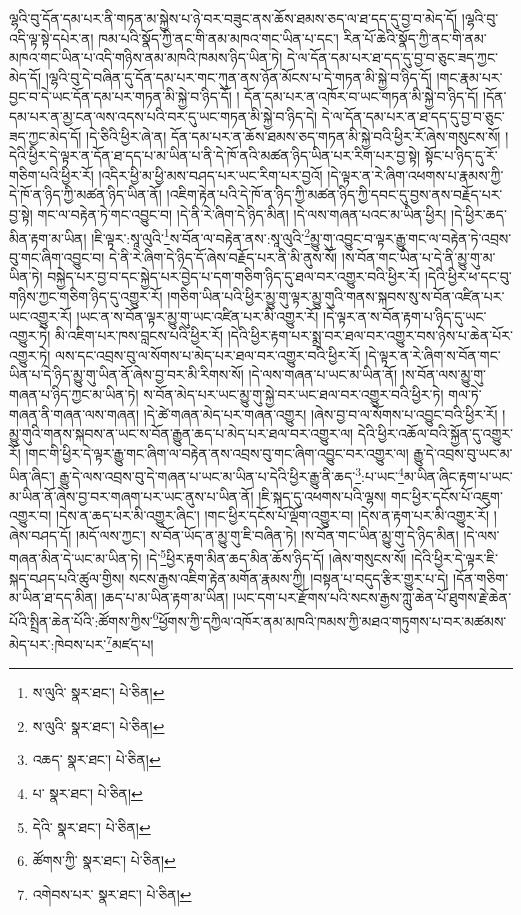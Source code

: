 ལྷའི་བུ་དོན་དམ་པར་ནི་གཏན་མ་སྐྱེས་པ་ཉེ་བར་བཟུང་ནས་ཆོས་ཐམས་ཅད་ལ་ཐ་དད་དུ་བྱ་བ་མེད་དོ། །ལྷའི་བུ་འདི་ལྟ་སྟེ་དཔེར་ན། ཁམ་པའི་སྣོད་ཀྱི་ནང་གི་ནམ་མཁའ་གང་ཡིན་པ་དང་། རིན་པོ་ཆེའི་སྣོད་ཀྱི་ནང་གི་ནམ་མཁའ་གང་ཡིན་པ་འདི་གཉིས་ནམ་མཁའི་ཁམས་ཉིད་ཡིན་ཏེ། དེ་ལ་དོན་དམ་པར་ཐ་དད་དུ་བྱ་བ་ཅུང་ཟད་ཀྱང་མེད་དོ། །ལྷའི་བུ་དེ་བཞིན་དུ་དོན་དམ་པར་གང་ཀུན་ནས་ཉོན་མོངས་པ་དེ་གཏན་མི་སྐྱེ་བ་ཉིད་དོ། །གང་རྣམ་པར་བྱང་བ་དེ་ཡང་དོན་དམ་པར་གཏན་མི་སྐྱེ་བ་ཉིད་དོ། །
དོན་དམ་པར་ན་འཁོར་བ་ཡང་གཏན་མི་སྐྱེ་བ་ཉིད་དོ། །དོན་དམ་པར་ན་མྱ་ངན་ལས་འདས་པའི་བར་དུ་ཡང་གཏན་མི་སྐྱེ་བ་ཉིད་དེ། དེ་ལ་དོན་དམ་པར་ན་ཐ་དད་དུ་བྱ་བ་ཅུང་ཟད་ཀྱང་མེད་དོ། །དེ་ཅིའི་ཕྱིར་ཞེ་ན། དོན་དམ་པར་ན་ཆོས་ཐམས་ཅད་གཏན་མི་སྐྱེ་བའི་ཕྱིར་རོ་ཞེས་གསུངས་སོ། །དེའི་ཕྱིར་དེ་ལྟར་ན་དོན་ཐ་དད་པ་མ་ཡིན་པ་ནི་དེ་ཁོ་ནའི་མཚན་ཉིད་ཡིན་པར་རིག་པར་བྱ་སྟེ། སྟོང་པ་ཉིད་དུ་རོ་གཅིག་པའི་ཕྱིར་རོ། །འདིར་ཕྱི་མ་ཕྱི་མས་བཤད་པར་ཡང་རིག་པར་བྱའོ། །དེ་ལྟར་ན་རེ་ཞིག་འཕགས་པ་རྣམས་ཀྱི་དེ་ཁོ་ན་ཉིད་ཀྱི་མཚན་ཉིད་ཡིན་ནོ། །འཇིག་རྟེན་པའི་དེ་ཁོ་ན་ཉིད་ཀྱི་མཚན་ཉིད་ཀྱི་དབང་དུ་བྱས་ནས་བརྗོད་པར་བྱ་སྟེ། གང་ལ་བརྟེན་ཏེ་གང་འབྱུང་བ། །དེ་ནི་རེ་ཞིག་དེ་ཉིད་མིན། །དེ་ལས་གཞན་པའང་མ་ཡིན་ཕྱིར། །དེ་ཕྱིར་ཆད་མིན་རྟག་མ་ཡིན། །ཇི་ལྟར་:སཱ་ལུའི་\footnote{ས་ལུའི་  སྣར་ཐང་།  པེ་ཅིན། }ས་བོན་ལ་བརྟེན་ནས་:སཱ་ལུའི་\footnote{ས་ལུའི་  སྣར་ཐང་།  པེ་ཅིན། }མྱུ་གུ་འབྱུང་བ་ལྟར་རྒྱུ་གང་ལ་བརྟེན་ཏེ་འབྲས་བུ་གང་ཞིག་འབྱུང་བ། དེ་ནི་རེ་ཞིག་དེ་ཉིད་དོ་ཞེས་བརྗོད་པར་ནི་མི་ནུས་སོ། །ས་བོན་གང་ཡིན་པ་དེ་ནི་མྱུ་གུ་མ་ཡིན་ཏེ། བསྐྱེད་པར་བྱ་བ་དང་སྐྱེད་པར་བྱེད་པ་དག་གཅིག་ཉིད་དུ་ཐལ་བར་འགྱུར་བའི་ཕྱིར་རོ། །དེའི་ཕྱིར་ཕ་དང་བུ་གཉིས་ཀྱང་གཅིག་ཉིད་དུ་འགྱུར་རོ། །གཅིག་ཡིན་པའི་ཕྱིར་མྱུ་གུ་ལྟར་མྱུ་གུའི་གནས་སྐབས་སུ་ས་བོན་འཛིན་པར་ཡང་འགྱུར་རོ། །ཡང་ན་ས་བོན་ལྟར་མྱུ་གུ་ཡང་འཛིན་པར་མི་འགྱུར་རོ། །དེ་ལྟར་ན་ས་བོན་རྟག་པ་ཉིད་དུ་ཡང་འགྱུར་ཏེ། མི་འཇིག་པར་ཁས་བླངས་པའི་ཕྱིར་རོ། །དེའི་ཕྱིར་རྟག་པར་སྨྲ་བར་ཐལ་བར་འགྱུར་བས་ཉེས་པ་ཆེན་པོར་འགྱུར་ཏེ། ལས་དང་འབྲས་བུ་ལ་སོགས་པ་མེད་པར་ཐལ་བར་འགྱུར་བའི་ཕྱིར་རོ། །དེ་ལྟར་ན་རེ་ཞིག་ས་བོན་གང་ཡིན་པ་དེ་ཉིད་མྱུ་གུ་ཡིན་ནོ་ཞེས་བྱ་བར་མི་རིགས་སོ། །དེ་ལས་གཞན་པ་ཡང་མ་ཡིན་ནོ། །ས་བོན་ལས་མྱུ་གུ་གཞན་པ་ཉིད་ཀྱང་མ་ཡིན་ཏེ། ས་བོན་མེད་པར་ཡང་མྱུ་གུ་སྐྱེ་བར་ཡང་ཐལ་བར་འགྱུར་བའི་ཕྱིར་ཏེ། གལ་ཏེ་གཞན་ནི་གཞན་ལས་གཞན། །དེ་ཚེ་གཞན་མེད་པར་གཞན་འགྱུར། །ཞེས་བྱ་བ་ལ་སོགས་པ་འབྱུང་བའི་ཕྱིར་རོ། །མྱུ་གུའི་གནས་སྐབས་ན་ཡང་ས་བོན་རྒྱུན་ཆད་པ་མེད་པར་ཐལ་བར་འགྱུར་ལ། དེའི་ཕྱིར་འཆོལ་བའི་སྐྱོན་དུ་འགྱུར་རོ། །གང་གི་ཕྱིར་དེ་ལྟར་རྒྱུ་གང་ཞིག་ལ་བརྟེན་ནས་འབྲས་བུ་གང་ཞིག་འབྱུང་བར་འགྱུར་ལ། རྒྱུ་དེ་འབྲས་བུ་ཡང་མ་ཡིན་ཞིང་། རྒྱུ་དེ་ལས་འབྲས་བུ་དེ་གཞན་པ་ཡང་མ་ཡིན་པ་དེའི་ཕྱིར་རྒྱུ་ནི་ཆད་\footnote{འཆད་  སྣར་ཐང་།  པེ་ཅིན། }:པ་ཡང་\footnote{པ་  སྣར་ཐང་།  པེ་ཅིན། }མ་ཡིན་ཞིང་རྟག་པ་ཡང་མ་ཡིན་ནོ་ཞེས་བྱ་བར་གཞག་པར་ཡང་ནུས་པ་ཡིན་ནོ། །ཇི་སྐད་དུ་འཕགས་པའི་ལྷས། གང་ཕྱིར་དངོས་པོ་འཇུག་འགྱུར་བ། །དེས་ན་ཆད་པར་མི་འགྱུར་ཞིང་། །གང་ཕྱིར་དངོས་པོ་ལྡོག་འགྱུར་བ། །དེས་ན་རྟག་པར་མི་འགྱུར་རོ། །ཞེས་བཤད་དོ། །མདོ་ལས་ཀྱང་། ས་བོན་ཡོད་ན་མྱུ་གུ་ཇི་བཞིན་ཏེ། །ས་བོན་གང་ཡིན་མྱུ་གུ་དེ་ཉིད་མིན། །དེ་ལས་གཞན་མིན་དེ་ཡང་མ་ཡིན་ཏེ། །དེ་\footnote{དེའི་  སྣར་ཐང་།  པེ་ཅིན། }ཕྱིར་རྟག་མིན་ཆད་མིན་ཆོས་ཉིད་དོ། །ཞེས་གསུངས་སོ། །དེའི་ཕྱིར་དེ་ལྟར་ཇི་སྐད་བཤད་པའི་ཚུལ་གྱིས། སངས་རྒྱས་འཇིག་རྟེན་མགོན་རྣམས་ཀྱི། །བསྟན་པ་བདུད་རྩིར་གྱུར་པ་དེ། །དོན་གཅིག་མ་ཡིན་ཐ་དད་མིན། །ཆད་པ་མ་ཡིན་རྟག་མ་ཡིན། །ཡང་དག་པར་རྫོགས་པའི་སངས་རྒྱས་ཀླུ་ཆེན་པོ་ཐུགས་རྗེ་ཆེན་པོའི་སྤྲིན་ཆེན་པོའི་:ཚོགས་ཀྱིས་\footnote{ཚོགས་ཀྱི་  སྣར་ཐང་།  པེ་ཅིན། }ཕྱོགས་ཀྱི་དཀྱིལ་འཁོར་ནམ་མཁའི་ཁམས་ཀྱི་མཐའ་གཏུགས་པ་བར་མཚམས་མེད་པར་:ཁེབས་པར་\footnote{འགེབས་པར་  སྣར་ཐང་།  པེ་ཅིན། }མཛད་པ། 